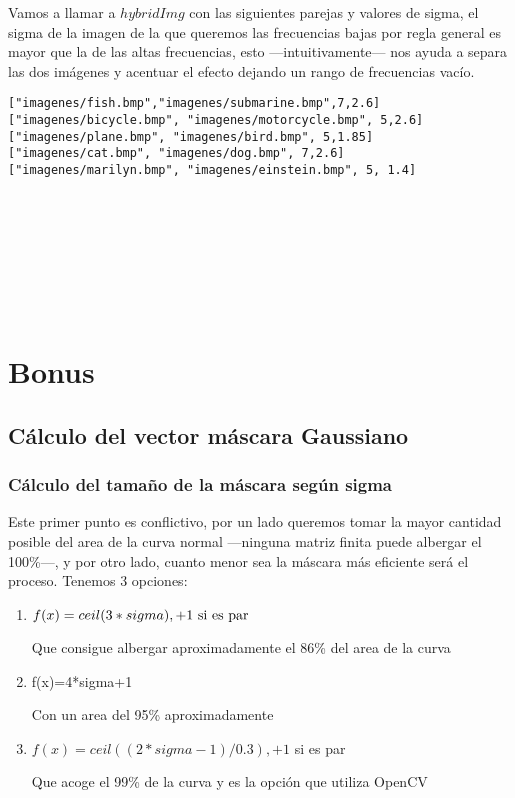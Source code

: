 \documentclass{article}
\newcommand{\img}[2]{
\noindent\makebox[\textwidth][c]{\texttt{[image: \#1]}}%
}
\begin{document}
Vamos a llamar a $hybridImg$ con las siguientes parejas y valores de sigma, el sigma de la imagen de la que queremos las frecuencias bajas por regla general es mayor que la de las altas frecuencias, esto ---intuitivamente--- nos ayuda a separa las dos imágenes y acentuar el efecto dejando un rango de frecuencias vacío.

\begin{lstlisting}
["imagenes/fish.bmp","imagenes/submarine.bmp",7,2.6]
["imagenes/bicycle.bmp", "imagenes/motorcycle.bmp", 5,2.6]
["imagenes/plane.bmp", "imagenes/bird.bmp", 5,1.85]
["imagenes/cat.bmp", "imagenes/dog.bmp", 7,2.6]
["imagenes/marilyn.bmp", "imagenes/einstein.bmp", 5, 1.4]
\end{lstlisting}

\img{eximg/ej9_5}{0.8}
\\

\img{eximg/ej9_3}{0.8}
\\

\img{eximg/ej9_4}{0.8}
\\

\img{eximg/ej9_2}{0.8}
\\

\img{eximg/ej9_1}{0.8}

\section{Bonus}

\subsection{Cálculo del vector máscara Gaussiano}

\subsubsection{Cálculo del tamaño de la máscara según sigma}

Este primer punto es conflictivo, por un lado queremos tomar la mayor cantidad posible del area de la curva normal ---ninguna matriz finita puede albergar el 100\%---, y por otro lado, cuanto menor sea la máscara más eficiente será el proceso. Tenemos 3 opciones:

\begin{enumerate}
\item $f(x)=ceil(3*sigma),+1 \textup{ si es par}$

Que consigue albergar aproximadamente el 86\% del area de la curva

\item f(x)=4*sigma+1

Con un area del 95\% aproximadamente

\item $f(x)=ceil((2*sigma-1)/0.3),+1$ si es par

Que acoge el 99\% de la curva y es la opción que utiliza OpenCV
\end{enumerate}
\end{document}
